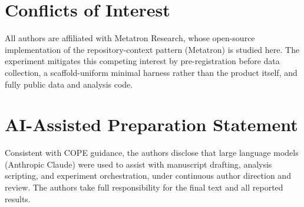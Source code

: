 \documentclass[sigconf,nonacm]{acmart}
\begin{document}
\section*{Conflicts of Interest}
All authors are affiliated with Metatron Research, whose open-source
implementation of the repository-context pattern (Metatron) is studied here.
The experiment mitigates this competing interest by pre-registration before
data collection, a scaffold-uniform minimal harness rather than the product
itself, and fully public data and analysis code.

\section*{AI-Assisted Preparation Statement}
Consistent with COPE guidance, the authors disclose that large language models
(Anthropic Claude) were used to assist with manuscript drafting, analysis
scripting, and experiment orchestration, under continuous author direction and
review. The authors take full responsibility for the final text and all
reported results.
\end{document}
